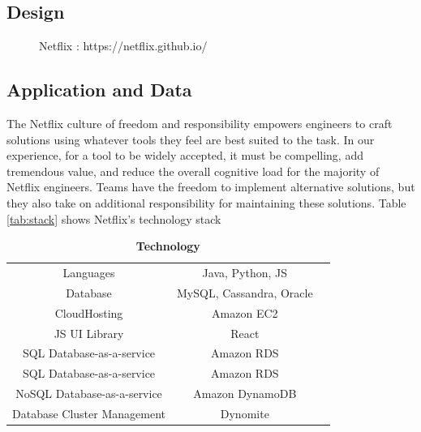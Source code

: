 \documentclass[9pt,twocolumn,twoside]{optica-suppl-materials}
\begin{document}
\subsection{Design}
\begin{figure}[htbp]
\centering
{}
\caption{Netflix : https://netflix.github.io/}
\label{fig:false-color}
\end{figure}

\subsection{Application and Data}
The Netflix culture of freedom and responsibility empowers engineers to craft solutions using whatever tools they feel are best suited to the task. In our experience, for a tool to be widely accepted, it must be compelling, add tremendous value, and reduce the overall cognitive load for the majority of Netflix engineers. Teams have the freedom to implement alternative solutions, but they also take on additional responsibility for maintaining these solutions. 
Table \ref{tab:stack} shows Netflix's technology stack

\begin{table}[htbp]
\centering
\caption{\bf Technology}
\label{stack}
\begin{tabular}{ccc}
\hline
Languages & Java, Python, JS \\
Database & MySQL, Cassandra, Oracle \\
CloudHosting & Amazon EC2 \\
JS UI Library & React \\
SQL Database-as-a-service & Amazon RDS \\
SQL Database-as-a-service & Amazon RDS \\
NoSQL Database-as-a-service & Amazon DynamoDB\\
Database Cluster Management & Dynomite\\
\hline
\end{tabular}
  \label{tab:shape-functions}
\end{table}
\end{document}
